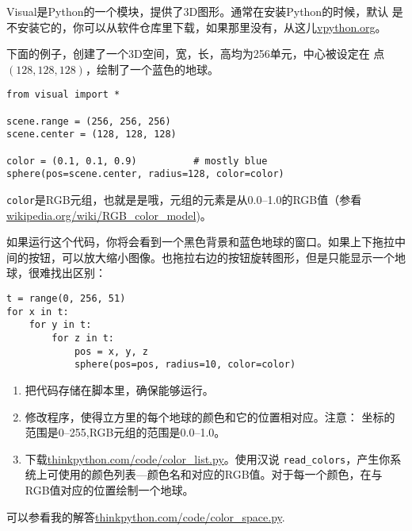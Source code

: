 \begin{ex}


Visual是Python的一个模块，提供了3D图形。通常在安装Python的时候，默认
是不安装它的，你可以从软件仓库里下载，如果那里没有，从这儿\url{vpython.org}。

下面的例子，创建了一个3D空间，宽，长，高均为256单元，中心被设定在 点
$(128,128,128)$，绘制了一个蓝色的地球。

\beforeverb
\begin{verbatim}
from visual import *

scene.range = (256, 256, 256)
scene.center = (128, 128, 128)

color = (0.1, 0.1, 0.9)          # mostly blue
sphere(pos=scene.center, radius=128, color=color)
\end{verbatim}
\afterverb

{\tt color}是RGB元组，也就是是哦，元组的元素是从0.0--1.0的RGB值（参看
\url{wikipedia.org/wiki/RGB_color_model})。

如果运行这个代码，你将会看到一个黑色背景和蓝色地球的窗口。如果上下拖拉中间的按钮，可以放大缩小图像。也拖拉右边的按钮旋转图形，但是只能显示一个地球，很难找出区别：

\beforeverb
\begin{verbatim}
t = range(0, 256, 51)
for x in t:
    for y in t:
        for z in t:
            pos = x, y, z
            sphere(pos=pos, radius=10, color=color)
\end{verbatim}
\afterverb


\begin{enumerate}

\item 把代码存储在脚本里，确保能够运行。

\item 修改程序，使得立方里的每个地球的颜色和它的位置相对应。注意：
坐标的范围是0--255,RGB元组的范围是0.0--1.0。


\item 下载\url{thinkpython.com/code/color_list.py}。使用汉说
\verb"read_colors"，产生你系统上可使用的颜色列表---颜色名和对应的RGB值。对于每一个颜色，在与RGB值对应的位置绘制一个地球。

\end{enumerate}

可以参看我的解答\url{thinkpython.com/code/color_space.py}.

\end{ex}





